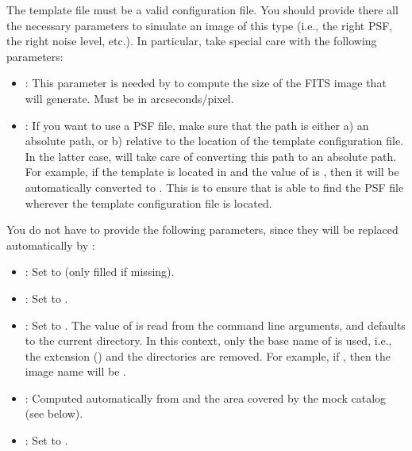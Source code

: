 The template file must be a valid \skymaker configuration file. You should provide there all the necessary parameters to simulate an image of this type (i.e., the right PSF, the right noise level, etc.). In particular, take special care with the following parameters:
\begin{itemize}
\item {}: This parameter is needed by  to compute the size of the FITS image that \skymaker will generate. Must be in arcseconds/pixel.
\item {}: If you want to use a PSF file, make sure that the path is either a) an absolute path, or b) relative to the location of the template configuration file. In the latter case,  will take care of converting this path to an absolute path. For example, if the template is located in  and the value of  is , then it will be automatically converted to . This is to ensure that \skymaker is able to find the PSF file wherever the template configuration file is located.
\end{itemize}
You do not have to provide the following parameters, since they will be replaced automatically by :
\begin{itemize}
\item {}: Set to  (only filled if missing).
\item {}: Set to .
\item {}: Set to . The value of  is read from the command line arguments, and defaults to the current directory. In this context, only the base name of  is used, i.e., the extension () and the directories are removed. For example, if , then the image name will be .
\item {}: Computed automatically from  and the area covered by the mock catalog (see below).
\item {}: Set to .
\end{itemize}

